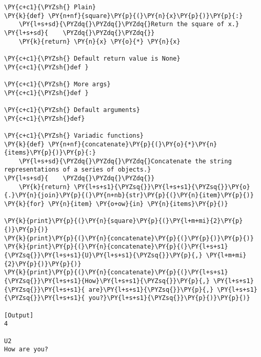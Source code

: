 \begin{Verbatim}[label=\makebox{\url{https://github.com/lucabaldini/cmepda/tree/master/slides/latex/snippets/functions.py}},commandchars=\\\{\}]
\PY{c+c1}{\PYZsh{} Plain}
\PY{k}{def} \PY{n+nf}{square}\PY{p}{(}\PY{n}{x}\PY{p}{)}\PY{p}{:}
    \PY{l+s+sd}{\PYZdq{}\PYZdq{}\PYZdq{}Return the square of x.}
\PY{l+s+sd}{    \PYZdq{}\PYZdq{}\PYZdq{}}
    \PY{k}{return} \PY{n}{x} \PY{o}{*} \PY{n}{x}

\PY{c+c1}{\PYZsh{} Default return value is None}
\PY{c+c1}{\PYZsh{}def }

\PY{c+c1}{\PYZsh{} More args}
\PY{c+c1}{\PYZsh{}def }

\PY{c+c1}{\PYZsh{} Default arguments}
\PY{c+c1}{\PYZsh{}def}

\PY{c+c1}{\PYZsh{} Variadic functions}
\PY{k}{def} \PY{n+nf}{concatenate}\PY{p}{(}\PY{o}{*}\PY{n}{items}\PY{p}{)}\PY{p}{:}
    \PY{l+s+sd}{\PYZdq{}\PYZdq{}\PYZdq{}Concatenate the string representations of a series of objects.}
\PY{l+s+sd}{    \PYZdq{}\PYZdq{}\PYZdq{}}
    \PY{k}{return} \PY{l+s+s1}{\PYZsq{}}\PY{l+s+s1}{\PYZsq{}}\PY{o}{.}\PY{n}{join}\PY{p}{(}\PY{n+nb}{str}\PY{p}{(}\PY{n}{item}\PY{p}{)} \PY{k}{for} \PY{n}{item} \PY{o+ow}{in} \PY{n}{items}\PY{p}{)}

\PY{k}{print}\PY{p}{(}\PY{n}{square}\PY{p}{(}\PY{l+m+mi}{2}\PY{p}{)}\PY{p}{)}
\PY{k}{print}\PY{p}{(}\PY{n}{concatenate}\PY{p}{(}\PY{p}{)}\PY{p}{)}
\PY{k}{print}\PY{p}{(}\PY{n}{concatenate}\PY{p}{(}\PY{l+s+s1}{\PYZsq{}}\PY{l+s+s1}{U}\PY{l+s+s1}{\PYZsq{}}\PY{p}{,} \PY{l+m+mi}{2}\PY{p}{)}\PY{p}{)}
\PY{k}{print}\PY{p}{(}\PY{n}{concatenate}\PY{p}{(}\PY{l+s+s1}{\PYZsq{}}\PY{l+s+s1}{How}\PY{l+s+s1}{\PYZsq{}}\PY{p}{,} \PY{l+s+s1}{\PYZsq{}}\PY{l+s+s1}{ are}\PY{l+s+s1}{\PYZsq{}}\PY{p}{,} \PY{l+s+s1}{\PYZsq{}}\PY{l+s+s1}{ you?}\PY{l+s+s1}{\PYZsq{}}\PY{p}{)}\PY{p}{)}

[Output]
4

U2
How are you?
\end{Verbatim}